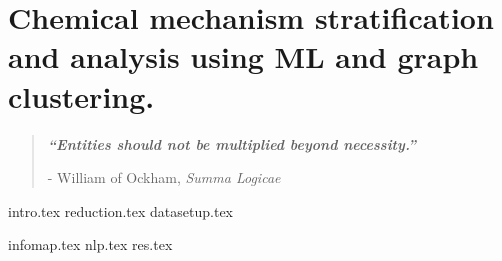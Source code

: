 

\chapter{ Chemical mechanism stratification and analysis using ML and graph clustering. }


\blankpage
\restoregeometry
\vspace*{0.15\paperheight}


\begin{center}
\begin{quotation}
  \large{\emph{\textbf{``Entities should not be multiplied beyond necessity.''} }  }  \\
  \begin{flushright}
  - William of Ockham, \textit{Summa Logicae}
  \end{flushright}
 \end{quotation}
\end{center}
\newpage

\doublespacing

 {intro.tex}
 {reduction.tex}
  {datasetup.tex}

  {infomap.tex}
 {nlp.tex} %
  {res.tex}
 
\chapterbib


